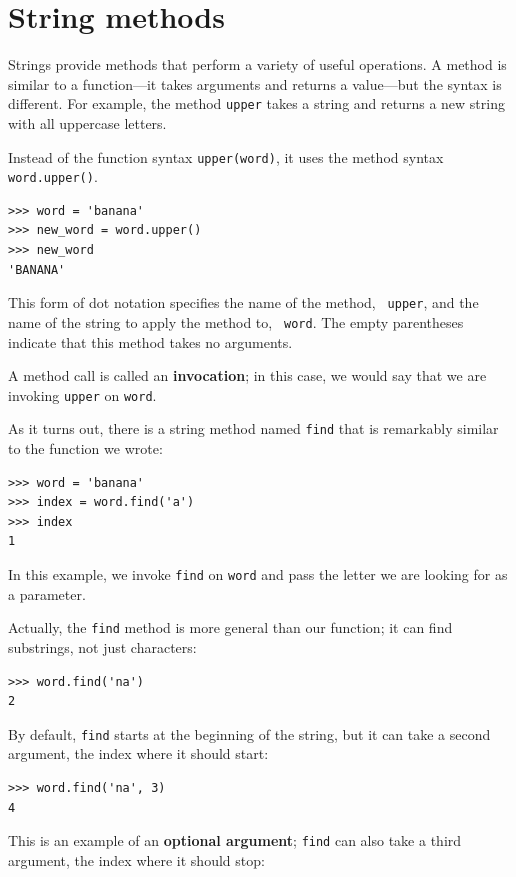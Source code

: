 \documentclass[10pt]{book}
\begin{document}
\section{String methods}
\label{optional}

Strings provide methods that perform a variety of useful operations.
A method is similar to a function---it takes arguments and
returns a value---but the syntax is different.  For example, the
method {\tt upper} takes a string and returns a new string with
all uppercase letters.

Instead of the function syntax {\tt upper(word)}, it uses
the method syntax {\tt word.upper()}.

\begin{verbatim}
>>> word = 'banana'
>>> new_word = word.upper()
>>> new_word
'BANANA'
\end{verbatim}
%
This form of dot notation specifies the name of the method, {\tt
upper}, and the name of the string to apply the method to, {\tt
word}.  The empty parentheses indicate that this method takes no
arguments.

A method call is called an {\bf invocation}; in this case, we would
say that we are invoking {\tt upper} on {\tt word}.

As it turns out, there is a string method named {\tt find} that
is remarkably similar to the function we wrote:

\begin{verbatim}
>>> word = 'banana'
>>> index = word.find('a')
>>> index
1
\end{verbatim}
%
In this example, we invoke {\tt find} on {\tt word} and pass
the letter we are looking for as a parameter.

Actually, the {\tt find} method is more general than our function;
it can find substrings, not just characters:

\begin{verbatim}
>>> word.find('na')
2
\end{verbatim}
%
By default, {\tt find} starts at the beginning of the string, but
it can take a second argument, the index where it should start:

\begin{verbatim}
>>> word.find('na', 3)
4
\end{verbatim}
%
This is an example of an {\bf optional argument};
{\tt find} can
also take a third argument, the index where it should stop:
\end{document}
